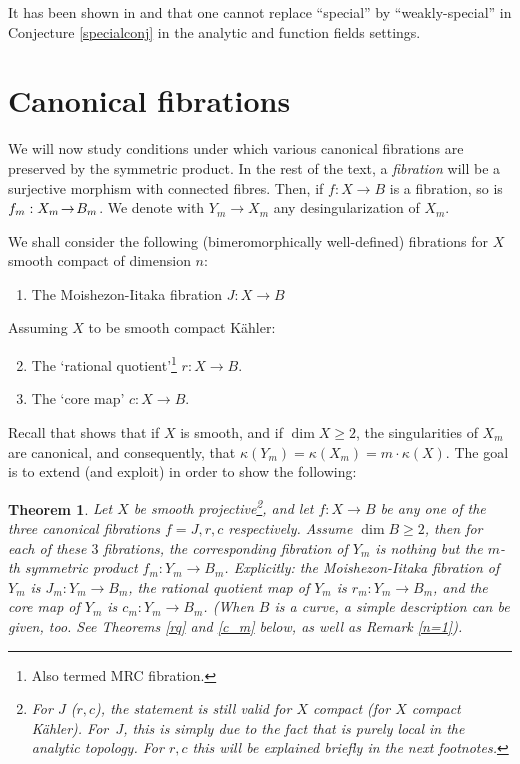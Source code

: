 \documentclass[JEP,XML,SOM,Unicode, NoEqCountersInSection,NoFloatCountersInSection,published]{cedram}
\theoremstyle{theorem}
\newtheorem{theorem}{Theorem}
\theoremstyle{definition}
\begin{document}
It has been shown in \cite{CP07} and \cite{RTW} that one cannot replace ``special'' by ``weakly-special'' in Conjecture \ref{specialconj} in the analytic and function fields settings.

\section{Canonical fibrations}\label{sec:canonical}

We will now study conditions under which various canonical fibrations are preserved by the symmetric product. In the rest of the text, a \emph{fibration} will be a surjective morphism with connected fibres. Then, if $f : X\!\to\!B$ is a fibration, so is $f_m : X_m \!\to\!\nobreak B_m$. We denote with $Y_m\to X_m$ any desingularization of $X_m$.

We shall consider the following (bimeromorphically well-defined) fibrations for $X$ smooth compact of dimension $n$:

\begin{enumerate}
\item The Moishezon-Iitaka fibration $J:X\to B$
\end{enumerate}

\noindent
Assuming $X$ to be smooth compact Kähler:
\begin{enumerate}
\setcounter{enumi}{1}

\item The `rational quotient'\footnote{Also termed MRC fibration.} $r:X\to B$.

\item The `core map' $c:X\to B$.
\end{enumerate}

Recall that \cite{AA02} shows that if $X$ is smooth, and if $\dim X \geq 2$, the singularities of $X_m$ are canonical, and consequently, that $\kappa(Y_m)=\kappa(X_m)=m\cdot \kappa(X)$. The goal is to extend (and exploit) \cite{AA02} in order to show the following:

\begin{theorem} Let $X$ be smooth projective\footnote{For $J$ (\resp $r,c$), the statement is still valid for $X$ compact (\resp for $X$ compact Kähler). For~$J$, this is simply due to the fact that \cite{AA02} is purely local in the analytic topology. For $r,c$ this will be explained briefly in the next footnotes.}, and let $f:X\to B$ be any one of the three canonical fibrations $f=J,r,c$ respectively. Assume $\dim B\geq 2$, then for each of these $3$ fibrations, the corresponding fibration of $Y_m$ is nothing but the $m$-th symmetric product $f_m:Y_m\to B_m$. Explicitly: the Moishezon-Iitaka fibration of $Y_m$ is $J_m:Y_m\to B_m$, the rational quotient map of $Y_m$ is $r_m:Y_m\to B_m$, and the core map of $Y_m$ is $c_m:Y_m\to B_m$. (When $B$ is a curve, a simple description can be given, too. See Theorems \ref{rq} and \ref{c_m} below, as well as Remark \ref{n=1}).\end{theorem}
\end{document}
